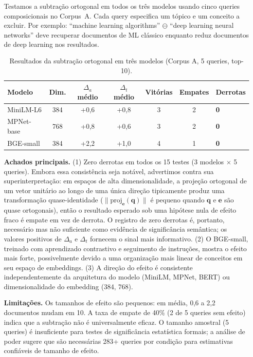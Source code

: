 \documentclass{article}
\begin{document}
Testamos a subtração ortogonal em todos os três modelos usando cinco queries composicionais no Corpus~A. Cada query especifica um tópico e um conceito a excluir. Por exemplo: ``machine learning algorithms'' $\ominus$ ``deep learning neural networks'' deve recuperar documentos de ML clássico enquanto reduz documentos de deep learning nos resultados.

\begin{table}[ht]
\centering
\caption{Resultados da subtração ortogonal em três modelos (Corpus A, 5 queries, top-10).}
\label{tab:exp1}
\begin{tabular}{lcccccl}
\toprule
Modelo & Dim. & $\Delta_a$ médio & $\Delta_t$ médio & Vitórias & Empates & Derrotas \\
\midrule
MiniLM-L6 & 384 & +0,6 & +0,8 & 3 & 2 & \textbf{0} \\
MPNet-base & 768 & +0,8 & +0,6 & 3 & 2 & \textbf{0} \\
BGE-small & 384 & +2,2 & +1,0 & 4 & 1 & \textbf{0} \\
\bottomrule
\end{tabular}
\end{table}

\textbf{Achados principais.} (1) Zero derrotas em todos os 15 testes (3 modelos $\times$ 5 queries). Embora essa consistência seja notável, advertimos contra sua superinterpretação: em espaços de alta dimensionalidade, a projeção ortogonal de um vetor unitário ao longo de uma única direção tipicamente produz uma transformação quase-identidade ($\|\text{proj}_\mathbf{e}(\mathbf{q})\|$ é pequeno quando $\mathbf{q}$ e $\mathbf{e}$ são quase ortogonais), então o resultado esperado sob uma hipótese nula de efeito fraco é empate em vez de derrota. O registro de zero derrotas é, portanto, necessário mas não suficiente como evidência de significância semântica; os valores positivos de $\Delta_a$ e $\Delta_t$ fornecem o sinal mais informativo. (2) O BGE-small, treinado com aprendizado contrastivo e seguimento de instruções, mostra o efeito mais forte, possivelmente devido a uma organização mais linear de conceitos em seu espaço de embeddings. (3) A direção do efeito é consistente independentemente da arquitetura do modelo (MiniLM, MPNet, BERT) ou dimensionalidade do embedding (384, 768).

\textbf{Limitações.} Os tamanhos de efeito são pequenos: em média, 0,6 a 2,2 documentos mudam em 10. A taxa de empate de 40\% (2 de 5 queries sem efeito) indica que a subtração não é universalmente eficaz. O tamanho amostral (5 queries) é insuficiente para testes de significância estatística formais; a análise de poder sugere que são necessárias 283+ queries por condição para estimativas confiáveis de tamanho de efeito.
\end{document}

